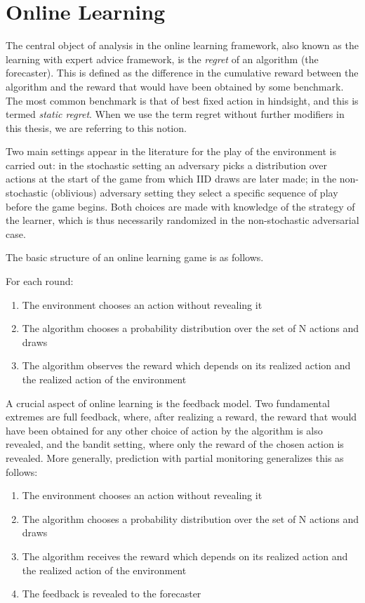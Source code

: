 \section{Online Learning}


The central object of analysis in the online learning framework, also known as the learning with expert advice framework, is the \emph{regret} of an algorithm (the forecaster). This is defined as the difference in the cumulative reward between the algorithm and the reward that would have been obtained by some benchmark. 
The most common benchmark is that of best fixed action in hindsight, and this is termed \emph{static regret}. 
When we use the term regret without further modifiers in this thesis, we are referring to this notion.

Two main settings appear in the literature for the play of the environment is carried out: in the stochastic setting an adversary picks a distribution over actions at the start of the game from which IID draws are later made; in the non-stochastic (oblivious) adversary setting they select a specific sequence of play before the game begins. Both choices are made with knowledge of the strategy of the learner, which is thus necessarily randomized in the non-stochastic adversarial case.

The basic structure of an online learning game is as follows.

For each round:
\begin{enumerate}
\item The environment chooses an action without revealing it
\item The algorithm chooses a probability distribution over the set of N actions and draws
\item The algorithm observes the reward which depends on its realized action and the realized action of the environment
\end{enumerate}

A crucial aspect of online learning is the feedback model. Two fundamental extremes are full feedback, where, after realizing a reward, the reward that would have been obtained for any other choice of action by the algorithm is also revealed, and the bandit setting, where only the reward of the chosen action is revealed. 
More generally, prediction with partial monitoring \cite{cesa2006regret} generalizes this as follows:

\begin{enumerate}
\item The environment chooses an action without revealing it
\item The algorithm chooses a probability distribution over the set of N actions and draws
\item The algorithm receives the reward which depends on its realized action and the realized action of the environment
\item The feedback is revealed to the forecaster
\end{enumerate}

